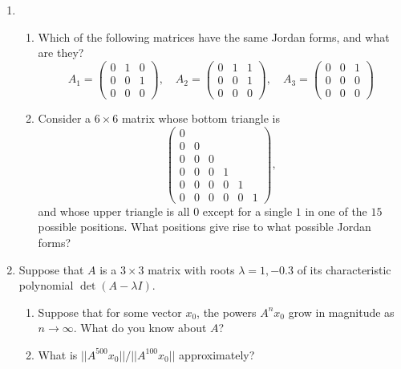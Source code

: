\documentclass[11pt]{article}
\begin{document}
\begin{enumerate}
\begin{enumerate}
\end{enumerate}
\item
\begin{enumerate}
\item Which of the following matrices have the same Jordan forms, and what are they?
\[A_1 = \begin{pmatrix} 0 & 1 & 0 \\ 0& 0 & 1 \\ 0& 0 & 0 \end{pmatrix}, \quad A_2 = \begin{pmatrix} 0 & 1 & 1 \\ 0& 0 & 1 \\ 0& 0 & 0 \end{pmatrix}, \quad A_3 = \begin{pmatrix} 0 & 0 & 1 \\ 0& 0 & 0 \\ 0& 0 & 0 \end{pmatrix}\]
\item Consider a $6 \times 6$ matrix whose bottom triangle is
\[ \begin{pmatrix} 0 &&&&& \\ 0 & 0 &&&& \\ 0 & 0 & 0 &&& \\ 0 & 0 & 0 & 1 && \\ 0 & 0 & 0 & 0 & 1 & \\ 0 & 0 & 0 & 0 & 0 & 1 \end{pmatrix}, \]
and whose upper triangle is all $0$ except for a single $1$ in one of the $15$ possible positions.  What positions give rise to what possible Jordan forms?

\end{enumerate}

\item Suppose that $A$ is a $3 \times 3$ matrix with roots $\lambda = 1, -0.3$ of its characteristic polynomial $\det(A - \lambda I)$.
\begin{enumerate}

\item Suppose that for some vector $x_0$, the powers $A^n x_0$ grow in magnitude as $n \to \infty$.  What do you know about $A$?

\item  What is $||A^{500}x_0||/||A^{100} x_0||$ approximately?

\end{enumerate}




















\end{enumerate}
\end{document}
